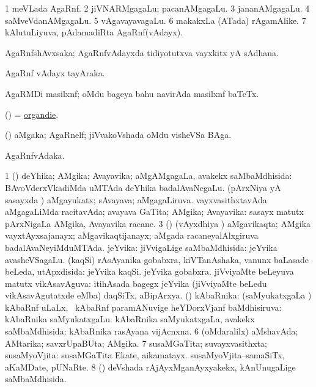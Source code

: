 \noindent
\gl{\pagu}
\bmng
\bnum
\num{1}  meVLada AgaRnf. 
\num{2}  jiVNARMgagaLu; pacanAMgagaLu. 
\num{3}  jananAMgagaLu. 
\num{4}  saMveVdanAMgagaLu. 
\num{5}  vAgavayavagaLu. 
\num{6}  makakxLa (ATada) rAgamAlike. 
\num{7}  kAlutuLiyuva, pAdamadiRta AgaRnf(vAdayx). 
\enum
\emng
\eentry

\bentry
{}
\gl{\nA}
\bmng
AgaRnfshAvxsaka; AgaRnfvAdayxda tidiyotutxva vayxkitx yA sAdhana. 
\emng
\eentry

\bentry
{}
\gl{\nA}
\bmng
AgaRnf vAdayx tayAraka. 
\emng
\eentry

\bentry
{}
\gl{\nA}
\bmng
AgaRMDi masilxnf; oMdu bageya bahu navirAda masilxnf baTeTx. 
\emng
\eentry

\bentry
{}
\gl{\nA}
\bmng
(\ame) = \hyperlink{organdie}{organdie}. 
\emng
\eentry

\bentry
{}
\gl{\nA}
\bmng
(\jiVvi) aMgaka; AgaRnelf; jiVvakoVshada oMdu visheVSa BAga. 
\emng
\eentry

\bentry
{}
\gl{\nA}
\bmng
AgaRnfvAdaka. 
\emng
\eentry

\bentry
{}
\gl{\gu}
\bmng
\bnum
\num{1} (\shavi) deYhika; AMgika; Avayavika; aMgAMgagaLa, avakekx saMbaMdhisida:  BAvoVderxVkadiMda uMTAda deYhika badalAvaNegaLu. 
 (pArxNiya yA sasayxda \vi) 
\banum
{} aMgayukatx; sAvayava; aMgagaLiruva. 
 vayxvasithxtavAda aMgagaLiMda racitavAda; avayava GaTita; AMgika; Avayavika:  sasayx matutx pArxNigaLa AMgika, Avayavika racane. 
\eanum
\numie
\num{3} (\roVshA) (vAyxdhiya \vi) aMgavikaqta; AMgika vayxtAyxsajanayx; aMgavikaqtijanayx; aMgada racaneyalAlxgiruva badalAvaNeyiMduMTAda. 
 jeYvika: 
\banum
{} jiVvigaLige saMbaMdhisida:  jeYvika avasheVSagaLu. 
 (kaqSi) rAsAyanika gobabxra, kiVTanAshaka, \mo vanunx baLasade beLeda, utApxdisida:  jeYvika kaqSi.  jeYvika gobabxra. 
 jiVviyaMte beLeyuva matutx vikAsavAguva:  itihAsada bagegx jeYvika (jiVviyaMte beLedu vikAsavAgutatxde eMba) daqSiTx, aBipArxya. 
\eanum
\numie
{} (\ravi) kAbaRnika: 
\banum
{} (saMyukatxgaLa \vi) kAbaRnf uLaLx, \kanmu\ kAbaRnf paramANuvige heYDorxVjanf baMdhisiruva:  kAbaRnika saMyukatxgaLu. 
 kAbaRnika saMyukatxgaLa, avakekx saMbaMdhisida:  kAbaRnika rasAyana vijAcnxna. 
\eanum
\numie
\num{6} (oMdaralilx) aMshavAda; AMtarika; savxrUpaBUta; AMgika. 
\num{7} susaMGaTita; suvayxvasithxta; susaMyoVjita:  susaMGaTita Ekate, aikamatayx.  susaMyoVjita--samaSiTx, aKaMDate, pUNaRte. 
\num{8} (\nAyxshA) deVshada rAjAyxMganAyxyakekx, kAnUnugaLige saMbaMdhisida. 
\enum
\emng
\eentry


